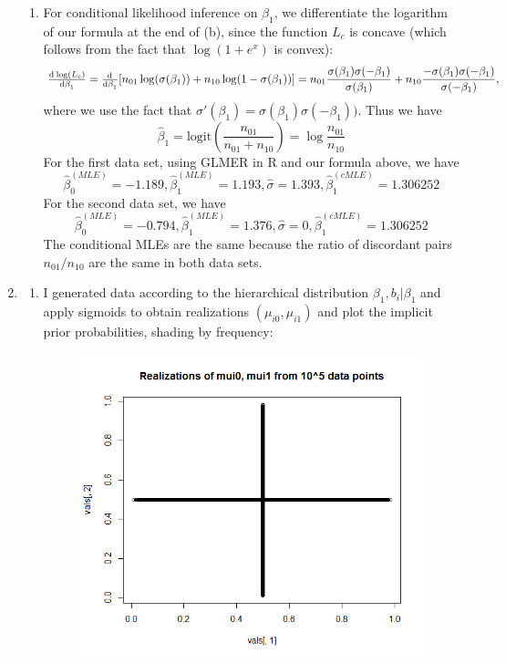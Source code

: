 \documentclass[11pt]{article}
\begin{document}
\begin{enumerate}
\begin{enumerate}
			\item For conditional likelihood inference on $\beta_1$, we differentiate the logarithm of our formula at the end of (b), since the function $L_c$ is concave (which follows from the fact that $\log(1+e^{x})$ is convex):
			\[
				\od{\log(L_c)}{\beta_1} = \od{}{\beta_1} [n_{01}\log(\sigma(\beta_1)) + n_{10}\log(1-\sigma(\beta_1))] = n_{01}\frac{\sigma(\beta_1)\sigma(-\beta_1)}{\sigma(\beta_1)} + n_{10}\frac{-\sigma(\beta_1)\sigma(-\beta_1)}{\sigma(-\beta_1)},
			\]
			where we use the fact that $\sigma'(\beta_1)= \sigma(\beta_1)\sigma(-\beta_1))$. Thus we have
			\[
				\widehat{\beta}_1 = \mathrm{logit}\left(\frac{n_{01}}{n_{01}+n_{10}}\right) = \log\frac{n_{01}}{n_{10}}
			\]
			For the first data set, using GLMER in R and our formula above, we have
			\[
				\widehat{\beta}_0^{(MLE)}=-1.189, \widehat{\beta}_1^{(MLE)} = 1.193, \widehat{\sigma} = 1.393, \widehat{\beta}_1^{(cMLE)} = 1.306252
			\]
			For the second data set, we have
			\[
				\widehat{\beta}_0^{(MLE)}=-0.794, \widehat{\beta}_1^{(MLE)} = 1.376, \widehat{\sigma} = 0, \widehat{\beta}_1^{(cMLE)} = 1.306252
			\]
			The conditional MLEs are the same because the ratio of discordant pairs $n_{01}/n_{10}$ are the same in both data sets.
		\end{enumerate}
	\item
		\begin{enumerate}
			\item 
I generated data according to the hierarchical distribution $\beta_1 , b_i|\beta_1$ and apply sigmoids to obtain realizations $(\mu_{i0},\mu_{i1})$ and plot the implicit prior probabilities, shading by frequency:
			\begin{figure}[H]
			\centering
				\includegraphics[scale=0.4]{Rplotp32}

\end{figure}
\end{enumerate}
\end{enumerate}
\end{document}
